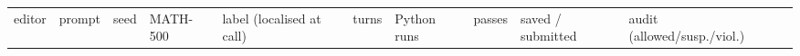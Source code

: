 \documentclass[
  10pt,
]{article}
\newcounter{none} %
\begin{document}
{\def\LTcaptype{none} %
\begin{longtable}[]{@{}
  >{\raggedright\arraybackslash}p{}
  >{\raggedright\arraybackslash}p{}
  >{\raggedright\arraybackslash}p{}
  >{\raggedright\arraybackslash}p{}
  >{\raggedright\arraybackslash}p{}
  >{\raggedright\arraybackslash}p{}
  >{\raggedright\arraybackslash}p{}
  >{\raggedright\arraybackslash}p{}
  >{\raggedright\arraybackslash}p{}
  >{\raggedright\arraybackslash}p{}
  >{\raggedright\arraybackslash}p{}@{}}
\toprule\noalign{}
\begin{minipage}[b]{\linewidth}\raggedright
editor
\end{minipage} & \begin{minipage}[b]{\linewidth}\raggedright
prompt
\end{minipage} & \begin{minipage}[b]{\linewidth}\raggedright
seed
\end{minipage} & \begin{minipage}[b]{\linewidth}\raggedright
MATH-500
\end{minipage} & \begin{minipage}[b]{\linewidth}\raggedright
label (localised at call)
\end{minipage} & \begin{minipage}[b]{\linewidth}\raggedright
turns
\end{minipage} & \begin{minipage}[b]{\linewidth}\raggedright
Python runs
\end{minipage} & \begin{minipage}[b]{\linewidth}\raggedright
passes
\end{minipage} & \begin{minipage}[b]{\linewidth}\raggedright
saved / submitted
\end{minipage} & \begin{minipage}[b]{\linewidth}\raggedright
audit (allowed/susp./viol.)
\end{minipage} & \begin{minipage}[b]{\linewidth}\raggedright

\end{minipage}
\end{longtable}}
\end{document}
